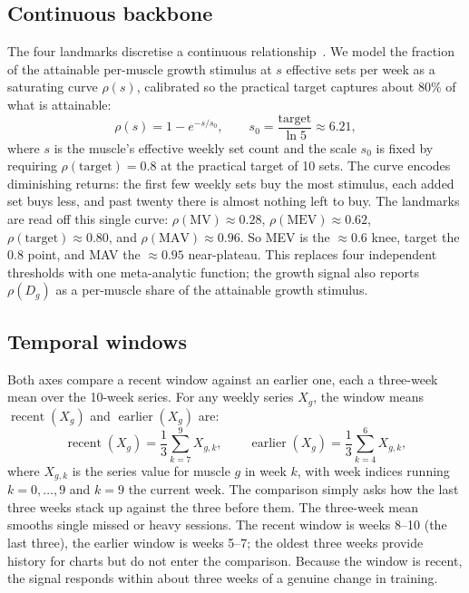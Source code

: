 \documentclass[11pt,a4paper]{article}
\newcommand{\MV}{\mathrm{MV}}
\newcommand{\MEV}{\mathrm{MEV}}
\newcommand{\MAV}{\mathrm{MAV}}
\newcommand{\recent}{\operatorname{recent}}
\newcommand{\earlier}{\operatorname{earlier}}
\begin{document}
\subsection{Continuous backbone}
The four landmarks discretise a continuous relationship~\cite{sch17,drr}. We model the fraction of the attainable per-muscle growth stimulus at $s$ effective sets per week as a saturating curve $\rho(s)$, calibrated so the practical target captures about $80\%$ of what is attainable:
\begin{equation}\label{eq:doseresp}
\rho(s)=1-e^{-s/s_0},\qquad s_0=\frac{\text{target}}{\ln 5}\approx 6.21,
\end{equation}
where $s$ is the muscle's effective weekly set count and the scale $s_0$ is fixed by requiring $\rho(\text{target})=0.8$ at the practical target of 10 sets. The curve encodes diminishing returns: the first few weekly sets buy the most stimulus, each added set buys less, and past twenty there is almost nothing left to buy. The landmarks are read off this single curve: $\rho(\MV)\approx0.28$, $\rho(\MEV)\approx0.62$, $\rho(\text{target})\approx0.80$, and $\rho(\MAV)\approx0.96$. So MEV is the $\approx0.6$ knee, target the $0.8$ point, and MAV the $\approx0.95$ near-plateau. This replaces four independent thresholds with one meta-analytic function; the growth signal also reports $\rho(D_g)$ as a per-muscle share of the attainable growth stimulus.

\subsection{Temporal windows}
Both axes compare a recent window against an earlier one, each a three-week mean over the 10-week series. For any weekly series $X_g$, the window means $\recent(X_g)$ and $\earlier(X_g)$ are:
\begin{equation}\label{eq:windows}
\recent(X_g)=\frac{1}{3}\sum_{k=7}^{9} X_{g,k},
\qquad
\earlier(X_g)=\frac{1}{3}\sum_{k=4}^{6} X_{g,k},
\end{equation}
where $X_{g,k}$ is the series value for muscle $g$ in week $k$, with week indices running $k=0,\dots,9$ and $k=9$ the current week. The comparison simply asks how the last three weeks stack up against the three before them. The three-week mean smooths single missed or heavy sessions. The recent window is weeks 8--10 (the last three), the earlier window is weeks 5--7; the oldest three weeks provide history for charts but do not enter the comparison. Because the window is recent, the signal responds within about three weeks of a genuine change in training.
\end{document}
